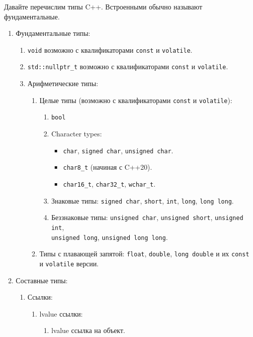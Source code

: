 Давайте перечислим типы C++. Встроенными обычно называют фундаментальные.
\begin{enumerate}
\item Фундаментальные типы:
\begin{enumerate}
\item \verb"void" возможно с квалификаторами \verb"const" и \verb"volatile".

\item \verb"std::nullptr_t" возможно с квалификаторами \verb"const" и \verb"volatile".

\item Арифметические типы:
\begin{enumerate}
\item Целые типы (возможно с квалификаторами \verb"const" и \verb"volatile"):
\begin{enumerate}
\item \verb"bool"

\item Character types:
\begin{itemize}
\item \verb"char", \verb"signed char", \verb"unsigned char".

\item \verb"char8_t" (начиная с C++20).

\item \verb"char16_t", \verb"char32_t", \verb"wchar_t".
\end{itemize}

\item Знаковые типы: \verb"signed char", \verb"short", \verb"int", \verb"long", \verb"long long".


\item Беззнаковые типы: \verb"unsigned char", \verb"unsigned short", \verb"unsigned int", \\
\verb"unsigned long", \verb"unsigned long long".
\end{enumerate}

\item Типы с плавающей запятой: \verb"float", \verb"double", \verb"long double" и их \verb"const" и \verb"volatile" версии.
\end{enumerate}
\end{enumerate}

\item Составные типы:
\begin{enumerate}
\item Ссылки:
\begin{enumerate}
\item lvalue ссылки:
\begin{enumerate}
\item lvalue ссылка на объект.


\end{enumerate}
\end{enumerate}
\end{enumerate}
\end{enumerate}
